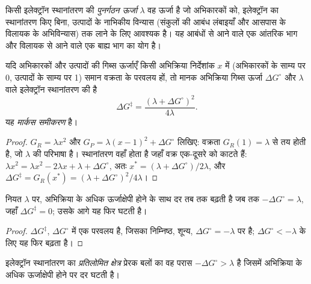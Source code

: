 \begin{definition}[पुनर्गठन ऊर्जा]\label{def:b3:complex-mechanisms:reorganisation}
किसी इलेक्ट्रॉन स्थानांतरण की \emph{पुनर्गठन ऊर्जा} $\lambda$ वह
ऊर्जा है जो अभिकारकों को, इलेक्ट्रॉन का स्थानांतरण किए बिना, उत्पादों के
नाभिकीय विन्यास (संकुलों की आबंध लंबाइयाँ और आसपास के विलायक के अभिविन्यास)
तक लाने के लिए आवश्यक है। यह आबंधों से आने वाले एक आंतरिक भाग और विलायक से आने वाले
एक बाह्य भाग का योग है।
\end{definition}

\begin{theorem}[मार्कस समीकरण]\label{thm:b3:complex-mechanisms:marcus}
यदि अभिकारकों और उत्पादों की गिब्स ऊर्जाएँ किसी अभिक्रिया निर्देशांक $x$ में (अभिकारकों के साम्य पर 0,
उत्पादों के साम्य पर 1) समान वक्रता के परवलय हों, तो
मानक अभिक्रिया गिब्स ऊर्जा $\Delta G^\circ$ और  $\lambda$ वाले इलेक्ट्रॉन स्थानांतरण की
 है
\[
  \Delta G^{\ddagger} = \frac{(\lambda + \Delta G^\circ)^2}{4\lambda} .
\]
यह \emph{मार्कस समीकरण} है।
\end{theorem}

\begin{proof}
$G_R = \lambda x^2$ और $G_P = \lambda(x - 1)^2 + \Delta G^\circ$ लिखिए: वक्रता $G_R(1) = \lambda$ से तय होती है, जो
$\lambda$ की परिभाषा है। स्थानांतरण वहाँ होता है जहाँ वक्र एक-दूसरे को काटते हैं: $\lambda x^2 = \lambda x^2 - 2\lambda x + \lambda +
\Delta G^\circ$, अतः $x^\ast = (\lambda + \Delta G^\circ)/2\lambda$, और $\Delta G^{\ddagger} = G_R(x^\ast) = (\lambda + \Delta G^\circ)^2/4\lambda$।
\end{proof}

\begin{corollary}[प्रतिलोमित क्षेत्र]\label{cor:b3:complex-mechanisms:inverted}
नियत $\lambda$ पर, अभिक्रिया के अधिक ऊर्जाक्षेपी होने के साथ दर तब तक बढ़ती है जब तक
$-\Delta G^\circ = \lambda$, जहाँ $\Delta G^{\ddagger} = 0$; उसके आगे यह फिर घटती है।
\end{corollary}

\begin{proof}
$\Delta G^{\ddagger}$, $\Delta G^\circ$ में एक परवलय है, जिसका निम्निष्ठ, शून्य, $\Delta G^\circ = -\lambda$ पर है; $\Delta G^\circ < -\lambda$ के लिए यह
फिर बढ़ता है।
\end{proof}

\begin{definition}[प्रतिलोमित क्षेत्र]\label{def:b3:complex-mechanisms:inverted}
इलेक्ट्रॉन स्थानांतरण का \emph{प्रतिलोमित क्षेत्र}
प्रेरक बलों का वह परास $-\Delta G^\circ > \lambda$ है जिसमें अभिक्रिया के अधिक ऊर्जाक्षेपी होने पर
दर घटती है।
\end{definition}

